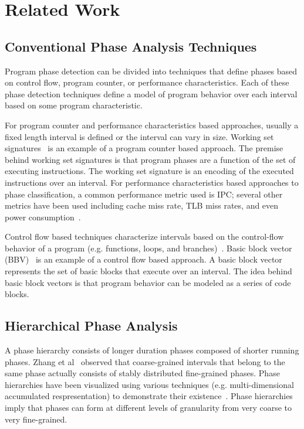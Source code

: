 \section{Related Work}

\subsection{Conventional Phase Analysis Techniques}
Program phase detection can be divided into techniques that define phases based on control flow, program counter, or performance characteristics. Each of these phase detection techniques define a model of program behavior over each interval based on some program characteristic.

For program counter and performance characteristics based approaches, usually a fixed length interval is defined or the interval can vary in size. Working set signatures~\cite{Dhodapkar:2002:MMH} is an example of a program counter based approach. The premise behind working set signatures is that program phases are a function of the set of executing instructions. The working set signature is an encoding of the executed instructions over an interval.  For performance characteristics based approaches to phase classification, a common performance metric used is IPC; several other metrics have been used including cache miss rate, TLB miss rates, and even power consumption~\cite{Balasubramonian:2000:MHR}\cite{Isci:2006:PCP}. 

Control flow based techniques characterize intervals based on the control-flow behavior of a program (e.g. functions, loops, and branches)~\cite{Huang:2003:PAP}\cite{Shen:2004:LPP}\cite{Zhang:2015:MPA}. Basic block vector (BBV)~\cite{Sherwood:2002:ACL} is an example of a control flow based approach. A basic block vector represents the set of basic blocks that execute over an interval. The idea behind basic block vectors is that program behavior can be modeled as a series of code blocks.

\subsection{Hierarchical Phase Analysis}

A phase hierarchy consists of longer duration phases composed of shorter running phases. Zhang et al~\cite{Zhang:2015:MPA} observed that coarse-grained intervals that belong to the same phase actually consists of stably distributed fine-grained phases. Phase hierarchies have been visualized using various techniques (e.g. multi-dimensional accumulated respresentation) to demonstrate their existence~\cite{Lau:2005:MVL}. Phase hierarchies imply that phases can form at different levels of granularity from very coarse to very fine-grained.


